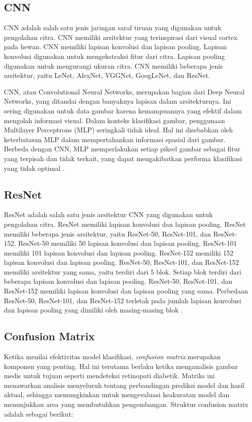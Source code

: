 \subsection{CNN}
\label{sec:223}

CNN adalah salah satu jenis jaringan saraf tiruan yang digunakan untuk pengolahan citra. CNN memiliki arsitektur yang terinspirasi dari visual cortex pada hewan. CNN memiliki lapisan konvolusi dan lapisan pooling. Lapisan konvolusi digunakan untuk mengekstraksi fitur dari citra. Lapisan pooling digunakan untuk mengurangi ukuran citra. CNN memiliki beberapa jenis arsitektur, yaitu LeNet, AlexNet, VGGNet, GoogLeNet, dan ResNet.

CNN, atau Convolutional Neural Networks, merupakan bagian dari Deep Neural Networks, yang ditandai dengan banyaknya lapisan dalam arsitekturnya. Ini sering digunakan untuk data gambar karena kemampuannya yang efektif dalam mengolah informasi visual. Dalam konteks klasifikasi gambar, penggunaan Multilayer Perceptrons (MLP) seringkali tidak ideal. Hal ini disebabkan oleh keterbatasan MLP dalam mempertahankan informasi spasial dari gambar. Berbeda dengan CNN, MLP memperlakukan setiap piksel gambar sebagai fitur yang terpisah dan tidak terkait, yang dapat mengakibatkan performa klasifikasi yang tidak optimal \parencite{AstutiSamsuryadi2018}.

\subsection{ResNet}
\label{sec:224}

ResNet adalah salah satu jenis arsitektur CNN yang digunakan untuk pengolahan citra. ResNet memiliki lapisan konvolusi dan lapisan pooling. ResNet memiliki beberapa jenis arsitektur, yaitu ResNet-50, ResNet-101, dan ResNet-152. ResNet-50 memiliki 50 lapisan konvolusi dan lapisan pooling. ResNet-101 memiliki 101 lapisan konvolusi dan lapisan pooling. ResNet-152 memiliki 152 lapisan konvolusi dan lapisan pooling. ResNet-50, ResNet-101, dan ResNet-152 memiliki arsitektur yang sama, yaitu terdiri dari 5 blok. Setiap blok terdiri dari beberapa lapisan konvolusi dan lapisan pooling. ResNet-50, ResNet-101, dan ResNet-152 memiliki lapisan konvolusi dan lapisan pooling yang sama. Perbedaan ResNet-50, ResNet-101, dan ResNet-152 terletak pada jumlah lapisan konvolusi dan lapisan pooling yang dimiliki oleh masing-masing blok \parencite{He2016}.

\subsection{Confusion Matrix}
Ketika menilai efektivitas model klasifikasi, \emph{confusion matrix} merupakan komponen yang penting. Hal ini terutama berlaku ketika menganalisis gambar medis untuk tujuan seperti mendeteksi retinopati diabetik. Matriks ini menawarkan analisis menyeluruh tentang perbandingan prediksi model dan hasil aktual, sehingga memungkinkan untuk mengevaluasi keakuratan model dan menunjukkan area yang membutuhkan pengembangan.
Struktur confusion matrix adalah sebagai berikut:

